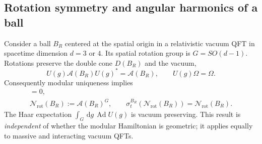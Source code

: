 \documentclass[a4paper,11pt]{article}
\theoremstyle{definition}
\newcommand{\dd}{\,\mathrm{d}}
\begin{document}
\subsection{Rotation symmetry and angular harmonics of a ball}
\label{subsec:qft-ball-rotations}
Consider a ball $B_R$ centered at the spatial origin in a relativistic
vacuum QFT in spacetime dimension $d=3$ or $4$. Its spatial rotation
group is $G=SO(d-1)$. Rotations preserve the double cone $D(B_R)$ and
the vacuum,
\begin{equation}
 U(g)\mathcal A(B_R)U(g)^*=\mathcal A(B_R),
 \qquad U(g)\Omega=\Omega .
\end{equation}
Consequently modular uniqueness implies
\begin{gather}
 [U(g),\Delta_{B_R}^{it}]=0,\nonumber\\
 \mathcal N_{\mathrm{rot}}(B_R)
  :=\mathcal A(B_R)^G, \qquad
 \sigma_t^{B_R}(\mathcal N_{\mathrm{rot}}(B_R))
   =\mathcal N_{\mathrm{rot}}(B_R).
 \label{eq:qft-rotation-invariant-algebra}
\end{gather}
The Haar expectation $\int_G\dd g\,\operatorname{Ad}U(g)$ is vacuum
preserving. This result is \emph{independent} of whether the modular
Hamiltonian is geometric; it applies equally to massive and
interacting vacuum QFTs.
\end{document}
